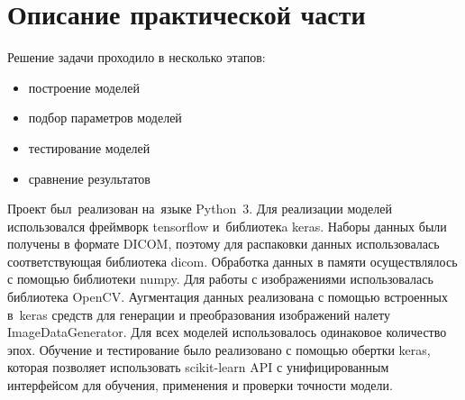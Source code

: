 \section{Описание практической части}

Решение задачи проходило в несколько этапов:

\begin{itemize}
  \item построение моделей 
  \item подбор параметров моделей
  \item тестирование моделей
  \item сравнение результатов
\end{itemize}

Проект был~реализован на~языке Python~3. Для реализации моделей использовался фреймворк tensorflow и~библиотекa keras. Наборы данных были получены в формате DICOM, поэтому для распаковки данных использовалась соответствующая библиотека dicom. Обработка данных в памяти осуществлялось с помощью библиотеки numpy. Для работы с изображениями использовалась библиотека OpenCV. Аугментация данных реализована с помощью встроенных в~keras средств для генерации и преобразования изображений налету ImageDataGenerator. Для всех моделей использовалось одинаковое количество эпох. Обучение и тестирование было реализовано с помощью обертки keras, которая позволяет использовать scikit-learn API с унифицированным интерфейсом для обучения, применения и проверки точности модели.
